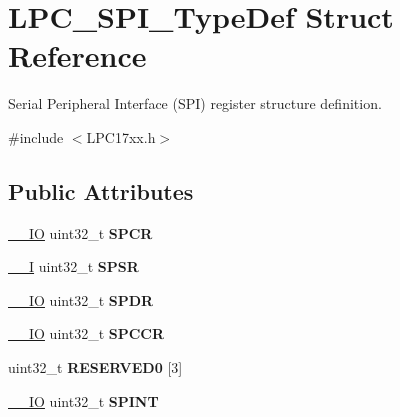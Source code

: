 \hypertarget{struct_l_p_c___s_p_i___type_def}{\section{\-L\-P\-C\-\_\-\-S\-P\-I\-\_\-\-Type\-Def \-Struct \-Reference}
\label{struct_l_p_c___s_p_i___type_def}
}


\-Serial \-Peripheral \-Interface (\-S\-P\-I) register structure definition.  




{\ttfamily \#include $<$\-L\-P\-C17xx.\-h$>$}

\subsection*{\-Public \-Attributes}
\begin{DoxyCompactItemize}
\item 
\hypertarget{struct_l_p_c___s_p_i___type_def_a2ce61227161a66342c0dce924d0321fb}{\hyperlink{group___c_m_s_i_s__core__definitions_gaec43007d9998a0a0e01faede4133d6be}{\-\_\-\-\_\-\-I\-O} uint32\-\_\-t {\bfseries \-S\-P\-C\-R}}\label{struct_l_p_c___s_p_i___type_def_a2ce61227161a66342c0dce924d0321fb}

\item 
\hypertarget{struct_l_p_c___s_p_i___type_def_aebaf5d2e15c80b727a52076ebdfe2f03}{\hyperlink{group___c_m_s_i_s__core__definitions_gaf63697ed9952cc71e1225efe205f6cd3}{\-\_\-\-\_\-\-I} uint32\-\_\-t {\bfseries \-S\-P\-S\-R}}\label{struct_l_p_c___s_p_i___type_def_aebaf5d2e15c80b727a52076ebdfe2f03}

\item 
\hypertarget{struct_l_p_c___s_p_i___type_def_a558ae704365ae5678d2f08a4e5074ec3}{\hyperlink{group___c_m_s_i_s__core__definitions_gaec43007d9998a0a0e01faede4133d6be}{\-\_\-\-\_\-\-I\-O} uint32\-\_\-t {\bfseries \-S\-P\-D\-R}}\label{struct_l_p_c___s_p_i___type_def_a558ae704365ae5678d2f08a4e5074ec3}

\item 
\hypertarget{struct_l_p_c___s_p_i___type_def_a1d5ce3ea68c2dfaec14d3597cdff996e}{\hyperlink{group___c_m_s_i_s__core__definitions_gaec43007d9998a0a0e01faede4133d6be}{\-\_\-\-\_\-\-I\-O} uint32\-\_\-t {\bfseries \-S\-P\-C\-C\-R}}\label{struct_l_p_c___s_p_i___type_def_a1d5ce3ea68c2dfaec14d3597cdff996e}

\item 
\hypertarget{struct_l_p_c___s_p_i___type_def_ab3810e1580fe80ed0b3651cf5c035ab7}{uint32\-\_\-t {\bfseries \-R\-E\-S\-E\-R\-V\-E\-D0} \mbox{[}3\mbox{]}}\label{struct_l_p_c___s_p_i___type_def_ab3810e1580fe80ed0b3651cf5c035ab7}

\item 
\hypertarget{struct_l_p_c___s_p_i___type_def_a44a40dbc05125566c6f8426daa13254a}{\hyperlink{group___c_m_s_i_s__core__definitions_gaec43007d9998a0a0e01faede4133d6be}{\-\_\-\-\_\-\-I\-O} uint32\-\_\-t {\bfseries \-S\-P\-I\-N\-T}}\label{struct_l_p_c___s_p_i___type_def_a44a40dbc05125566c6f8426daa13254a}

\end{DoxyCompactItemize}


